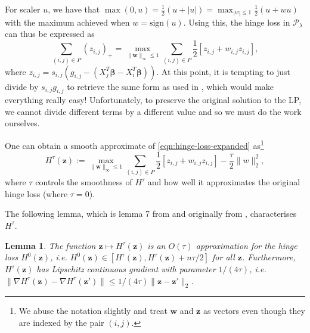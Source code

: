 \documentclass[a4paper, 11pt]{article}
\newcommand{\Pc}{\ensuremath{\mathcal{P}}}
\newcommand{\weights}{\ensuremath{\bm{\beta}}}
\newtheorem{lemma}{Lemma}
\begin{document}
For scaler $u$, we have that $\max(0, u) = \frac12 (u + |u|) = \max_{|w|
        \le 1} \frac12 (u + wu)$ with the maximum achieved when $w =
    \text{sign}(u)$. Using this, the hinge loss in $\Pc_\lambda$ can thus be expressed
as
\begin{equation}
    \sum_{(i,j) \in P} (z_{i,j})_+ = \max_{\lVert \bm{w} \rVert_\infty \le 1} \sum_{(i,j) \in P} \frac12 [z_{i,j} + w_{i,j} z_{i,j}], \label{eqn:hinge-loss-expanded}
\end{equation}
where $z_{i,j} = s_{i,j}(g_{i,j} - (X_j^T \weights - X_i^T \weights))$. At this
point, it is tempting to just divide by $s_{i,j} g_{i,j}$ to retrieve the same
form as used in \citet{Dedieu2022}, which would make everything really easy!
Unfortunately, to preserve the original solution to the LP, we cannot divide
different terms by a different value and so we must do the work ourselves.

One can obtain a smooth approximate of \eqref{eqn:hinge-loss-expanded}
as\footnote{We abuse the notation slightly and treat $\bm{w}$ and $\bm{z}$ as
    vectors even though they are indexed by the pair $(i, j)$.}
\begin{equation}
    H^\tau(\bm{z}) := \max_{\lVert \bm{w} \rVert_\infty \le 1} \sum_{(i,j) \in P} \frac12 [z_{i,j} + w_{i,j} z_{i,j}] - \frac{\tau}{2} \lVert w \rVert_2^2,
\end{equation}
where $\tau$ controls the smoothness of $H^\tau$ and how well it approximates
the original hinge loss (where $\tau=0$).

The following lemma, which is lemma 7 from \citet{Dedieu2022} and originally from
\citet{Nesterov2005}, characterises $H^\tau$.
\begin{lemma}\label{lem:smooth-approximation}
    The function $\bm{z} \mapsto H^\tau(\bm{z})$ is an $O(\tau)$ approximation
    for the hinge loss $H^0(\bm{z})$, i.e. $H^0(\bm{z}) \in [H^\tau(\bm{z}),
            H^\tau(\bm{z}) + n\tau / 2]$ for all $\bm{z}$. Furthermore, $H^\tau(\bm{z})$
    has Lipschitz continuous gradient with parameter $1/(4\tau)$, i.e. $\lVert
        \nabla H^\tau(\bm{z}) - \nabla H^\tau(\bm{z'}) \rVert \le 1/(4\tau) \lVert \bm{z} - \bm{z'} \rVert_2$.
\end{lemma}
\end{document}
